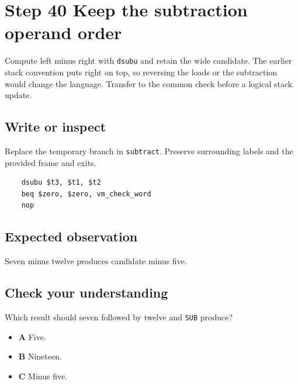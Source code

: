 \section{Step 40 Keep the subtraction operand order}\label{vm-s40}

Compute left minus right with \texttt{dsubu} and retain the wide candidate. The earlier stack convention puts right on top, so reversing the loads or the subtraction would change the language. Transfer to the common check before a logical stack update.

\subsection{Write or inspect}
Replace the temporary branch in \texttt{subtract}. Preserve surrounding labels and the provided frame and exits.

\begin{verbatim}
    dsubu $t3, $t1, $t2
    beq $zero, $zero, vm_check_word
    nop
\end{verbatim}
\subsection{Expected observation}
Seven minus twelve produces candidate minus five.

\subsection{Check your understanding}
Which result should seven followed by twelve and \texttt{SUB} produce?

\begin{itemize}
  \item \textbf{A} Five.
  \item \textbf{B} Nineteen.
  \item \textbf{C} Minus five.
\end{itemize}
